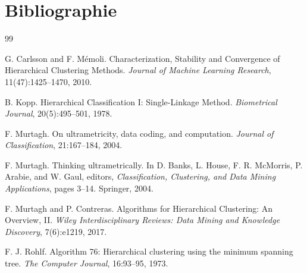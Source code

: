 \documentclass[11pt,a4paper]{article}
\begin{document}
\clearpage
\section*{Bibliographie}
\begin{thebibliography}{99}

G. Carlsson and F. Mémoli.
\newblock Characterization, Stability and Convergence of Hierarchical Clustering Methods.
\newblock \emph{Journal of Machine Learning Research}, 11(47):1425--1470, 2010.

B. Kopp.
\newblock Hierarchical Classification I: Single-Linkage Method.
\newblock \emph{Biometrical Journal}, 20(5):495--501, 1978.

F. Murtagh.
\newblock On ultrametricity, data coding, and computation.
\newblock \emph{Journal of Classification}, 21:167--184, 2004.

F. Murtagh.
\newblock Thinking ultrametrically.
\newblock In D. Banks, L. House, F. R. McMorris, P. Arabie, and W. Gaul, editors, \emph{Classification, Clustering, and Data Mining Applications}, pages 3--14. Springer, 2004.

F. Murtagh and P. Contreras.
\newblock Algorithms for Hierarchical Clustering: An Overview, II.
\newblock \emph{Wiley Interdisciplinary Reviews: Data Mining and Knowledge Discovery}, 7(6):e1219, 2017.

F. J. Rohlf.
\newblock Algorithm 76: Hierarchical clustering using the minimum spanning tree.
\newblock \emph{The Computer Journal}, 16:93--95, 1973.

\end{thebibliography}
\end{document}
